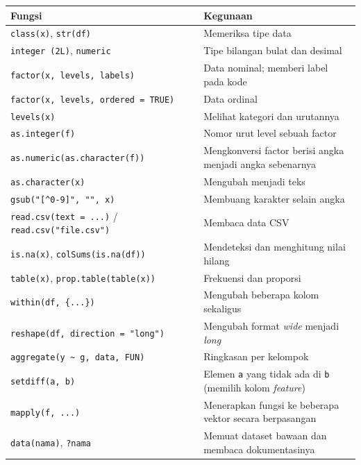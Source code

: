 \documentclass[
  indonesian,
  letterpaper,
]{book}
\newcounter{none} %
\begin{document}
{\def\LTcaptype{none} %
\begin{longtable}[]{@{}
  >{\raggedright\arraybackslash}p{}
  >{\raggedright\arraybackslash}p{}@{}}
\toprule\noalign{}
\begin{minipage}[b]{\linewidth}\raggedright
Fungsi
\end{minipage} & \begin{minipage}[b]{\linewidth}\raggedright
Kegunaan
\end{minipage} \\
\midrule\noalign{}
\endhead
\bottomrule\noalign{}
\endlastfoot
\texttt{class(x)}, \texttt{str(df)} & Memeriksa tipe data \\
\texttt{integer\ (2L)}, \texttt{numeric} & Tipe bilangan bulat dan
desimal \\
\texttt{factor(x,\ levels,\ labels)} & Data nominal; memberi label pada
kode \\
\texttt{factor(x,\ levels,\ ordered\ =\ TRUE)} & Data ordinal \\
\texttt{levels(x)} & Melihat kategori dan urutannya \\
\texttt{as.integer(f)} & Nomor urut level sebuah factor \\
\texttt{as.numeric(as.character(f))} & Mengkonversi factor berisi angka
menjadi angka sebenarnya \\
\texttt{as.character(x)} & Mengubah menjadi teks \\
\texttt{gsub("{[}\^{}0-9{]}",\ "",\ x)} & Membuang karakter selain
angka \\
\texttt{read.csv(text\ =\ ...)} / \texttt{read.csv("file.csv")} &
Membaca data CSV \\
\texttt{is.na(x)}, \texttt{colSums(is.na(df))} & Mendeteksi dan
menghitung nilai hilang \\
\texttt{table(x)}, \texttt{prop.table(table(x))} & Frekuensi dan
proporsi \\
\texttt{within(df,\ \{...\})} & Mengubah beberapa kolom sekaligus \\
\texttt{reshape(df,\ direction\ =\ "long")} & Mengubah format
\emph{wide} menjadi \emph{long} \\
\texttt{aggregate(y\ \textasciitilde{}\ g,\ data,\ FUN)} & Ringkasan per
kelompok \\
\texttt{setdiff(a,\ b)} & Elemen \texttt{a} yang tidak ada di \texttt{b}
(memilih kolom \emph{feature}) \\
\texttt{mapply(f,\ ...)} & Menerapkan fungsi ke beberapa vektor secara
berpasangan \\
\texttt{data(nama)}, \texttt{?nama} & Memuat dataset bawaan dan membaca
dokumentasinya \\
\end{longtable}
}
\end{document}
